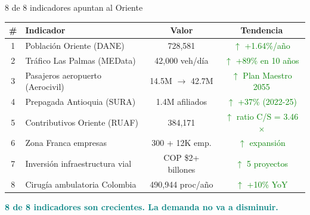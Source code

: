 \documentclass[aspectratio=169, 11pt]{beamer}
\newcommand{\highlight}[1]{\textcolor{teal}{\textbf{#1}}}
\newcommand{\src}[1]{\par\vspace{2pt}{\tiny\textcolor{slate}{Fuente: #1}}}
\begin{document}
\begin{frame}{8 de 8 indicadores apuntan al Oriente}
\vspace{-4pt}
\begin{center}
{\tiny\setlength{\tabcolsep}{4pt}
\begin{tabular}{@{}clcc@{}}
\toprule
\textbf{\#} & \textbf{Indicador} & \textbf{Valor} & \textbf{Tendencia} \\
\midrule
1 & Población Oriente (DANE) & 728,581 & \textcolor{green}{$\uparrow$ +1.64\%/año} \\
\rowcolor{teal!6}
2 & Tráfico Las Palmas (MEData) & 42,000 veh/día & \textcolor{green}{$\uparrow$ +89\% en 10 años} \\
3 & Pasajeros aeropuerto (Aerocivil) & 14.5M $\to$ 42.7M & \textcolor{green}{$\uparrow$ Plan Maestro 2055} \\
\rowcolor{teal!6}
4 & Prepagada Antioquia (SURA) & 1.4M afiliados & \textcolor{green}{$\uparrow$ +37\% (2022-25)} \\
5 & Contributivos Oriente (RUAF) & 384,171 & \textcolor{green}{$\uparrow$ ratio C/S = 3.46$\times$} \\
\rowcolor{teal!6}
6 & Zona Franca empresas & 300 + 12K emp. & \textcolor{green}{$\uparrow$ expansión} \\
7 & Inversión infraestructura vial & COP \$2+ billones & \textcolor{green}{$\uparrow$ 5 proyectos} \\
\rowcolor{teal!6}
8 & Cirugía ambulatoria Colombia & 490,944 proc/año & \textcolor{green}{$\uparrow$ +10\% YoY} \\
\bottomrule
\end{tabular}
}
\end{center}

\vspace{3pt}
\begin{exampleblock}{}
\centering\large
\highlight{8 de 8 indicadores son crecientes. La demanda no va a disminuir.}
\end{exampleblock}
\src{DANE, MEData, Aerocivil, SURA, RUAF, MinSalud SISPRO}
\end{frame}
\end{document}
